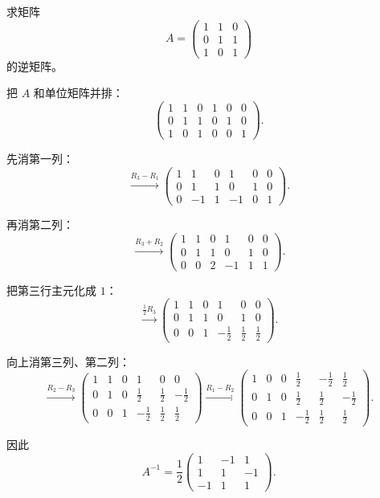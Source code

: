 \documentclass[11pt,oneside,UTF8]{ctexbook}
\begin{document}
\begin{examplebox}[例 4：求逆矩阵]
求矩阵
\[
A=
\begin{pmatrix}
1&1&0\\
0&1&1\\
1&0&1
\end{pmatrix}
\]
的逆矩阵。

把 \(A\) 和单位矩阵并排：
\[
\left(
\begin{array}{ccc|ccc}
1&1&0&1&0&0\\
0&1&1&0&1&0\\
1&0&1&0&0&1
\end{array}
\right).
\]

先消第一列：
\[
\xrightarrow{R_3-R_1}
\left(
\begin{array}{ccc|ccc}
1&1&0&1&0&0\\
0&1&1&0&1&0\\
0&-1&1&-1&0&1
\end{array}
\right).
\]

再消第二列：
\[
\xrightarrow{R_3+R_2}
\left(
\begin{array}{ccc|ccc}
1&1&0&1&0&0\\
0&1&1&0&1&0\\
0&0&2&-1&1&1
\end{array}
\right).
\]

把第三行主元化成 \(1\)：
\[
\xrightarrow{\frac12 R_3}
\left(
\begin{array}{ccc|ccc}
1&1&0&1&0&0\\
0&1&1&0&1&0\\
0&0&1&-\frac12&\frac12&\frac12
\end{array}
\right).
\]

向上消第三列、第二列：
\[
\xrightarrow{R_2-R_3}
\left(
\begin{array}{ccc|ccc}
1&1&0&1&0&0\\
0&1&0&\frac12&\frac12&-\frac12\\
0&0&1&-\frac12&\frac12&\frac12
\end{array}
\right)
\xrightarrow{R_1-R_2}
\left(
\begin{array}{ccc|ccc}
1&0&0&\frac12&-\frac12&\frac12\\
0&1&0&\frac12&\frac12&-\frac12\\
0&0&1&-\frac12&\frac12&\frac12
\end{array}
\right).
\]

因此
\[
A^{-1}=
\frac12
\begin{pmatrix}
1&-1&1\\
1&1&-1\\
-1&1&1
\end{pmatrix}.
\]
\end{examplebox}
\end{document}
